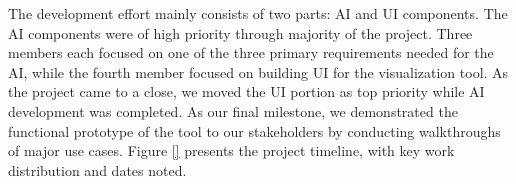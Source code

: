 The development effort mainly consists of two parts: AI and UI components.  The AI components were of high priority through majority of the project. Three members each focused on one of the three primary requirements needed for the AI, while the fourth member focused on building UI for the visualization tool. As the project came to a close, we moved the UI portion as top priority while AI development was completed. As our final milestone, we demonstrated the functional prototype of the tool to our stakeholders by conducting walkthroughs of major use cases. Figure \ref{} presents the project timeline, with key work distribution and dates noted. 

